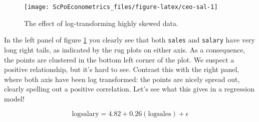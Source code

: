 \documentclass[]{book}
\newenvironment{Shaded}{\begin{snugshade}}{\end{snugshade}}
\newcommand{\KeywordTok}[1]{\textcolor[rgb]{0.13,0.29,0.53}{\textbf{#1}}}
\newcommand{\DataTypeTok}[1]{\textcolor[rgb]{0.13,0.29,0.53}{#1}}
\newcommand{\DecValTok}[1]{\textcolor[rgb]{0.00,0.00,0.81}{#1}}
\newcommand{\StringTok}[1]{\textcolor[rgb]{0.31,0.60,0.02}{#1}}
\newcommand{\OtherTok}[1]{\textcolor[rgb]{0.56,0.35,0.01}{#1}}
\newcommand{\OperatorTok}[1]{\textcolor[rgb]{0.81,0.36,0.00}{\textbf{#1}}}
\newcommand{\NormalTok}[1]{#1}
\begin{document}
\begin{Shaded}
\end{Shaded}

\begin{figure}

{\centering \texttt{[image: ScPoEconometrics\_files/figure-latex/ceo-sal-1]} 

}

\caption{The effect of log-transforming highly skewed data.}\label{fig:ceo-sal}
\end{figure}

In the left panel of figure \ref{fig:ceo-sal} you clearly see that both
\texttt{sales} and \texttt{salary} have very long right tails, as
indicated by the rug plots on either axis. As a consequence, the points
are clustered in the bottom left corner of the plot. We suspect a
positive relationship, but it's hard to see. Contrast this with the
right panel, where both axis have been log transformed: the points are
nicely spread out, clearly spelling out a positive correlation. Let's
see what this gives in a regression model!

\[
\text{logsalary} = 4.82 + 0.26(\text{logsales}) + \epsilon
\]
\end{document}
